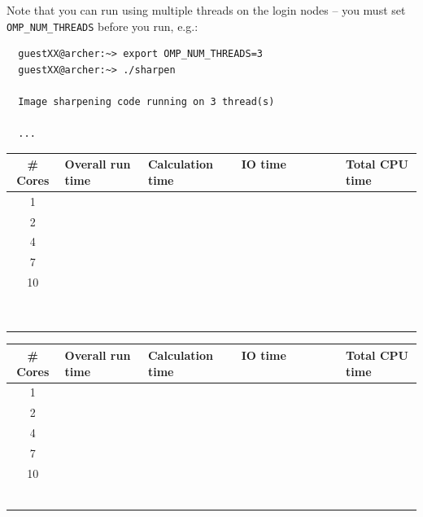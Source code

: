 \documentclass{article}
\begin{document}
Note that you can run using multiple threads on the login nodes -- you
must set \verb+OMP_NUM_THREADS+ before you run, e.g.:

\begin{verbatim}
  guestXX@archer:~> export OMP_NUM_THREADS=3 
  guestXX@archer:~> ./sharpen 

  Image sharpening code running on 3 thread(s)

  ...
\end{verbatim}

\begin{table}[h]
\begin{center}
\begin{tabular}{|c|l|l|l|l|}
\hline
\# Cores & Overall run time & Calculation time & IO time \ \ \ \ \
\ \ \ \
\ & Total
CPU time \\
\hline
\hline
1 & & & & \\
\hline
2 & & & & \\
\hline
4 & & & & \\
\hline
7 & & & & \\
\hline
10 & & & & \\
\hline
 & & & & \\
\hline
 & & & & \\
\hline
 & & & & \\
\hline
 & & & & \\
\hline
 & & & & \\
\hline
 & & & & \\
\hline
 & & & & \\
\hline
 & & & & \\
\hline
 & & & & \\
\hline
\end{tabular}
\begin{tabular}{|c|l|l|l|l|}
\hline
\# Cores & Overall run time & Calculation time & IO time \ \ \ \ \
\ \ \ \
\ & Total
CPU time \\
\hline
\hline
1 & & & & \\
\hline
2 & & & & \\
\hline
4 & & & & \\
\hline
7 & & & & \\
\hline
10 & & & & \\
\hline
 & & & & \\
\hline
 & & & & \\
\hline
 & & & & \\
\hline
 & & & & \\
\hline
 & & & & \\
\hline
 & & & & \\

\end{tabular}
\end{center}
\end{table}
\end{document}
